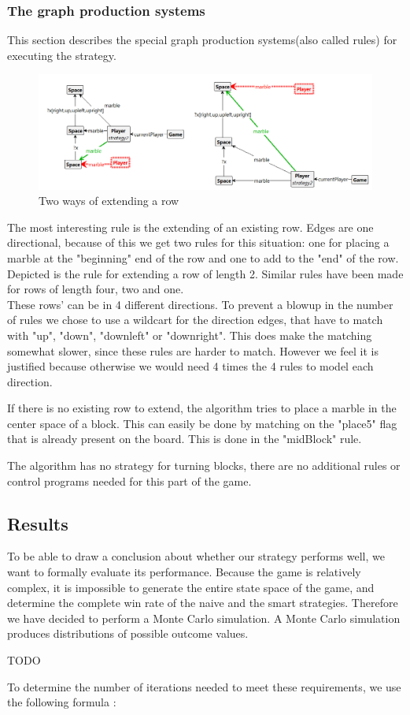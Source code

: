 \subsubsection{The graph production systems}
This section describes the special graph production systems(also called rules) for executing the strategy.

\begin{figure}[!h]
  \includegraphics[scale=0.5,clip]{Images/twocombined.png}
  \caption{Two ways of extending a row}
  \label{fig:twocombined}
\end{figure}

The most interesting rule is the extending of an existing row. Edges are one directional, because of this we get two rules for this situation: one for placing a marble at the "beginning" end of the row and one to add to the "end" of the row. Depicted is the rule for extending a row of length 2. Similar rules have been made for rows of length four, two and one.\\
These rows' can be in 4 different directions. To prevent a blowup in the number of rules we chose to use a wildcart for the direction edges, that have to match with "up", "down", "downleft" or "downright".
This does make the matching somewhat slower, since these rules are harder to match. However we feel it is justified because otherwise we would need 4 times the 4 rules to model each direction.

If there is no existing row to extend, the algorithm tries to place a marble in the center space of a block. This can easily be done by matching on the "place5" flag that is already present on the board. This is done in the "midBlock" rule.

The algorithm has no strategy for turning blocks, there are no additional rules or control programs needed for this part of the game.


\subsection{Results}
To be able to draw a conclusion about whether our strategy performs well, we want to formally evaluate its performance.
Because the game is relatively complex, it is impossible to generate the entire state space of the game, and determine the complete win rate of the naive and the smart strategies.
Therefore we have decided to perform a Monte Carlo simulation. A Monte Carlo simulation produces distributions of possible outcome values.

\vspace{6pt}

TODO

To determine the number of iterations needed to meet these requirements, we use the following formula \cite{sim-modeling}:

